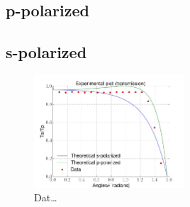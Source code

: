 \subsection{p-polarized}
\subsection{s-polarized}
\begin{figure}[h]
    \centering
    \includegraphics[width=0.5\textwidth]{transmission}
    \caption{Dat\ldots}
    \label{fig:transmission}
\end{figure}



